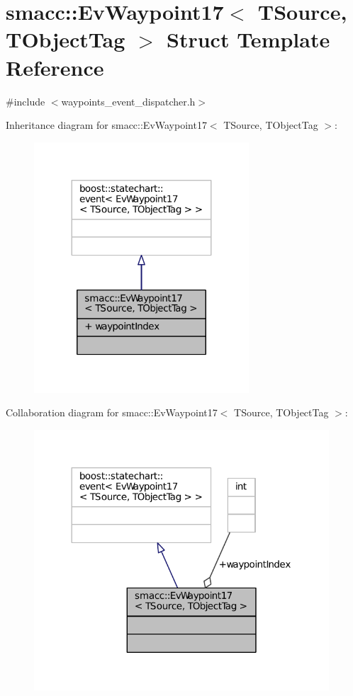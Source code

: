 \hypertarget{structsmacc_1_1EvWaypoint17}{}\section{smacc\+:\+:Ev\+Waypoint17$<$ T\+Source, T\+Object\+Tag $>$ Struct Template Reference}
\label{structsmacc_1_1EvWaypoint17}


{\ttfamily \#include $<$waypoints\+\_\+event\+\_\+dispatcher.\+h$>$}



Inheritance diagram for smacc\+:\+:Ev\+Waypoint17$<$ T\+Source, T\+Object\+Tag $>$\+:
\nopagebreak
\begin{figure}[H]
\begin{center}
\leavevmode
\includegraphics[width=227pt]{structsmacc_1_1EvWaypoint17__inherit__graph}
\end{center}
\end{figure}


Collaboration diagram for smacc\+:\+:Ev\+Waypoint17$<$ T\+Source, T\+Object\+Tag $>$\+:
\nopagebreak
\begin{figure}[H]
\begin{center}
\leavevmode
\includegraphics[width=312pt]{structsmacc_1_1EvWaypoint17__coll__graph}
\end{center}
\end{figure}
